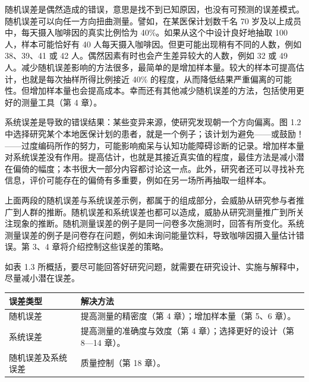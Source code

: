 随机误差是偶然造成的错误，意思是找不到已知原因，也没有可预测的误差模式。随机误差可以向任一方向扭曲测量。譬如，在某医保计划数千名 70 岁及以上成员中，每天摄入咖啡因的真实比例恰为 40\%。如果从这个中设计良好地抽取 100 人，样本可能恰好有 40 人每天摄入咖啡因。但更可能出现稍有不同的人数，例如 38、39、41 或 42 人。偶然因素有时也会产生差异较大的人数，例如 32 或 49 人。减少随机误差影响的方法很多，最简单的是增加样本量。较大的样本可提高估计，也就是每次抽样所得比例接近 40\% 的程度，从而降低结果严重偏离的可能性。但增加样本量也会提高成本。幸而还有其他减少随机误差的方法，包括使用更好的测量工具（第 4 章）。

系统误差是导致的错误结果：某些变异来源，使研究发现朝一个方向偏离。图 1.2 中选择研究某个本地医保计划的患者，就是一个例子；该计划为避免——或鼓励！——过度编码所作的努力，可能影响痴呆与认知功能障碍诊断的记录。增加样本量对系统误差没有作用。提高估计，也就是其接近真实值的程度，最佳方法是减小潜在偏倚的幅度；本书很大一部分内容都讨论这一点。此外，研究者还可以寻找补充信息，评价可能存在的偏倚有多重要，例如在另一场所再抽取一组样本。

上面两段的随机误差与系统误差示例，都属于的组成部分，会威胁从研究参与者推广到人群的推断。随机误差和系统误差也都可以造成，威胁从研究测量推广到所关注现象的推断。随机测量误差的例子是同一问卷多次施测时，回答有所变化。系统测量误差的例子是问卷存在问题，例如未询问能量饮料，导致咖啡因摄入量估计错误。第 3、4 章将介绍控制这些误差的策略。

如表 1.3 所概括，要尽可能回答好研究问题，就需要在研究设计、实施与解释中，尽量减小潜在误差。

\begin{center}\small
{}
\begin{tabularx}{\linewidth}{L{37mm}Y}\toprule
\textbf{误差类型}&\textbf{解决方法}\\\midrule
随机误差&提高测量的精密度（第 4 章）；增加样本量（第 5、6 章）。\\
系统误差&提高测量的准确度与效度（第 4 章）；选择更好的设计（第 8—14 章）。\\
随机误差及系统误差&质量控制（第 18 章）。\\\bottomrule
\end{tabularx}\end{center}

